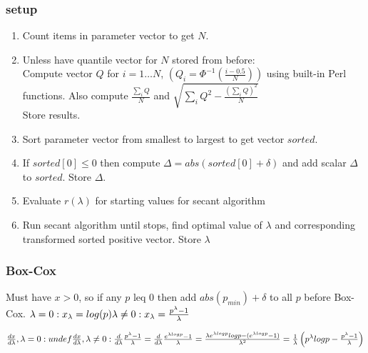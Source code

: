 \subsubsection*{setup}
\begin{enumerate}
\item Count items in parameter vector to get $N$.
\item Unless have quantile vector for $N$ stored from before:\\ Compute vector $Q$ for $i=1\ldots N$,
\begin{math}
\left(
Q_i=\Phi^{-1}\left(\frac{i-0.5}{N}\right)
\right)
\end{math}
using built-in Perl functions. Also compute $\frac{\sum_i{Q}}{N}$ and
$\sqrt{\sum_i{Q^2}-\frac{\left(\sum_i{Q}\right)^2}{N}}$\\ Store results.
\item Sort parameter vector from smallest to largest to get vector $sorted$.
\item If $sorted[0]\leq 0$ then compute $\Delta=abs\left(sorted[0]+\delta\right)$ and add scalar $\Delta$ to $sorted$.
Store $\Delta$.
\item Evaluate $r(\lambda)$ for starting values for secant algorithm
\item Run secant algorithm until stops, find optimal value of $\lambda$ and corresponding transformed sorted positive
vector. Store $\lambda$
\end{enumerate}

\subsubsection*{Box-Cox}
Must have $x>0$, so if any $p$ leq 0 then add $abs(p_{min})+\delta$ to all $p$ before Box-Cox.
\noindent
\begin{math}
\lambda = 0: x_{\lambda}=log(p)\\
\lambda\neq 0: x_{\lambda}=\frac{p^{\lambda}-1}{\lambda}
\end{math}

\begin{math}
\frac{dx}{d\lambda}, \lambda=0: undef\\
\frac{dx}{d\lambda}, \lambda\neq 0: \frac{d}{d\lambda}\frac{p^{\lambda}-1}{\lambda}=\frac{d}{d\lambda}\frac{e^{\lambda log{p}}-1}{\lambda}=
\frac{\lambda e^{\lambda log{p}}log{p} -(e^{\lambda log{p}}-1) }{\lambda^2}=\frac{1}{\lambda}\left(p^{\lambda}log{p} - \frac{p^{\lambda}-1}{\lambda}\right)
\end{math}

